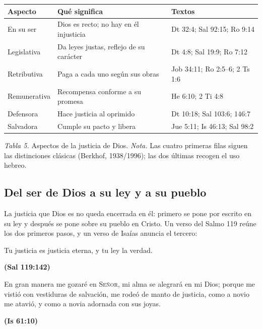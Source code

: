 \documentclass[11pt,letterpaper]{article}
\newcommand{\SENOR}{\textsc{Señor}}
\newcommand{\fuente}[1]{\par\hfill{\upshape\bfseries\small\textcolor{azul}{#1}}}
\begin{document}
\begin{center}\small\renewcommand{\arraystretch}{1.2}
\begin{tabular}{@{}L{3.3cm}L{5.5cm}L{5.6cm}@{}}
\toprule
\textbf{Aspecto} & \textbf{Qué significa} & \textbf{Textos} \\ \midrule
En su ser & Dios es recto; no hay en él injusticia & Dt 32:4; Sal 92:15; Ro 9:14 \\
Legislativa & Da leyes justas, reflejo de su carácter & Dt 4:8; Sal 19:9; Ro 7:12 \\
Retributiva & Paga a cada uno según sus obras & Job 34:11; Ro 2:5--6; 2 Ts 1:6 \\
Remunerativa & Recompensa conforme a su promesa & He 6:10; 2 Ti 4:8 \\
Defensora & Hace justicia al oprimido & Dt 10:18; Sal 103:6; 146:7 \\
Salvadora & Cumple su pacto y libera & Jue 5:11; Is 46:13; Sal 98:2 \\
\bottomrule
\end{tabular}\par
{\footnotesize\color{gris}\textit{Tabla 5.} Aspectos de la justicia de Dios. \textit{Nota.} Las cuatro primeras filas siguen las distinciones clásicas (Berkhof, 1938/1996); las dos últimas recogen el uso hebreo.}
\end{center}

\subsection{Del ser de Dios a su ley y a su pueblo}
La justicia que Dios es no queda encerrada en él: primero se pone por escrito en su ley y después se pone sobre su pueblo en Cristo. Un verso del Salmo 119 reúne los dos primeros pasos, y un verso de Isaías anuncia el tercero:

\begin{cita}Tu justicia es justicia eterna, y tu ley la verdad.\fuente{(Sal 119:142)}\end{cita}
\begin{cita}En gran manera me gozaré en \SENOR, mi alma se alegrará en mi Dios; porque me vistió con vestiduras de salvación, me rodeó de manto de justicia, como a novio me atavió, y como a novia adornada con sus joyas.\fuente{(Is 61:10)}\end{cita}
\end{document}

